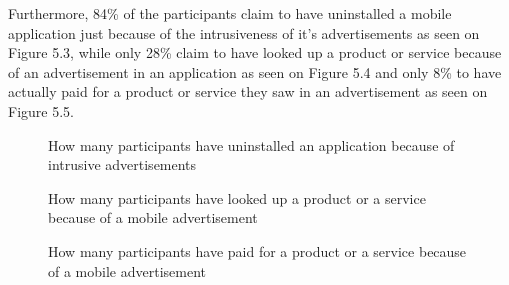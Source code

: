Furthermore, 84\% of the participants claim to have uninstalled a mobile application just because of the intrusiveness of it's advertisements as seen on Figure 5.3, while only 28\% claim to have looked up a product or service because of an advertisement in an application as seen on Figure 5.4 and only 8\% to have actually paid for a product or service they saw in an advertisement as seen on Figure 5.5.

\begin{figure}
\begin{center}
\caption{How many participants have uninstalled an application because of intrusive advertisements}
\end{center}
\end{figure}

\begin{figure}
\begin{center}
\caption{How many participants have looked up a product or a service because of a mobile advertisement}
\end{center}
\end{figure}

\begin{figure}
\begin{center}
\caption{How many participants have paid for a product or a service because of a mobile advertisement}
\end{center}
\end{figure}

